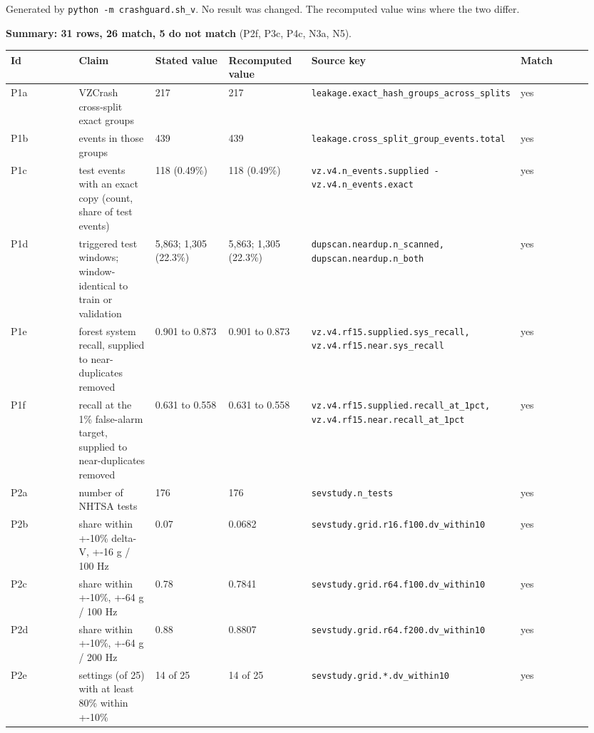 


Generated by \texttt{python -m crashguard.sh\_v}. No result was changed. The recomputed value wins where the two differ.

\textbf{Summary: 31 rows, 26 match, 5 do not match} (P2f, P3c, P4c, N3a, N5).

{\scriptsize\raggedright
\begin{longtable}{p{0.158\linewidth}p{0.158\linewidth}p{0.158\linewidth}p{0.158\linewidth}p{0.158\linewidth}p{0.158\linewidth}}
\toprule
Id & Claim & Stated value & Recomputed value & Source key & Match \\
\midrule
\endhead
P1a & VZCrash cross-split exact groups & 217 & 217 & \texttt{leakage.exact\_hash\_groups\_across\_splits} & yes \\
P1b & events in those groups & 439 & 439 & \texttt{leakage.cross\_split\_group\_events.total} & yes \\
P1c & test events with an exact copy (count, share of test events) & 118 (0.49\%) & 118 (0.49\%) & \texttt{vz.v4.n\_events.supplied - vz.v4.n\_events.exact} & yes \\
P1d & triggered test windows; window-identical to train or validation & 5,863; 1,305 (22.3\%) & 5,863; 1,305 (22.3\%) & \texttt{dupscan.neardup.n\_scanned, dupscan.neardup.n\_both} & yes \\
P1e & forest system recall, supplied to near-duplicates removed & 0.901 to 0.873 & 0.901 to 0.873 & \texttt{vz.v4.rf15.supplied.sys\_recall, vz.v4.rf15.near.sys\_recall} & yes \\
P1f & recall at the 1\% false-alarm target, supplied to near-duplicates removed & 0.631 to 0.558 & 0.631 to 0.558 & \texttt{vz.v4.rf15.supplied.recall\_at\_1pct, vz.v4.rf15.near.recall\_at\_1pct} & yes \\
P2a & number of NHTSA tests & 176 & 176 & \texttt{sevstudy.n\_tests} & yes \\
P2b & share within +-10\% delta-V, +-16 g / 100 Hz & 0.07 & 0.0682 & \texttt{sevstudy.grid.r16.f100.dv\_within10} & yes \\
P2c & share within +-10\%, +-64 g / 100 Hz & 0.78 & 0.7841 & \texttt{sevstudy.grid.r64.f100.dv\_within10} & yes \\
P2d & share within +-10\%, +-64 g / 200 Hz & 0.88 & 0.8807 & \texttt{sevstudy.grid.r64.f200.dv\_within10} & yes \\
P2e & settings (of 25) with at least 80\% within +-10\% & 14 of 25 & 14 of 25 & \texttt{sevstudy.grid.*.dv\_within10} & yes \\

\end{longtable}}
